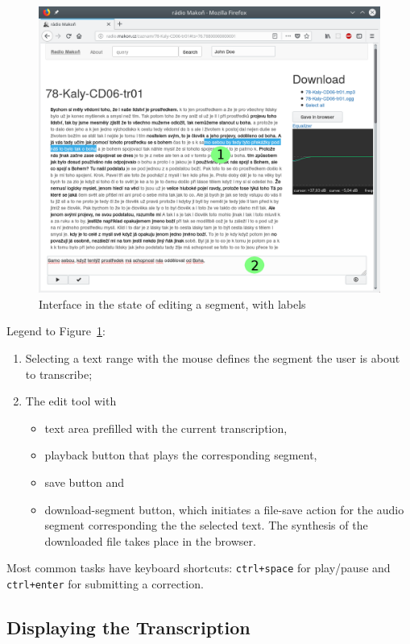 \documentclass{svproc}
\begin{document}
\begin{figure}[htpb]
\includegraphics[scale=0.6]{rc/radio-makon-en-2-lab.png}
\caption{Interface in the state of editing a segment, with labels}
\label{fig:scn2lab}
\end{figure}

Legend to Figure~\ref{fig:scn2lab}:
\begin{enumerate}
\item{
    Selecting a text range with the mouse defines the segment the user is about
    to transcribe;
}
\item{
    The edit tool with
    \begin{itemize}
    \item{text area prefilled with the current transcription,}
    \item{playback button that plays the corresponding segment,}
    \item{save button and}
    \item{download-segment button, which initiates a file-save action for the
    audio segment corresponding the the selected text. The synthesis of the
    downloaded file takes place in the browser.}
    \end{itemize}
}
\end{enumerate}

Most common tasks have keyboard shortcuts: \texttt{ctrl+space} for play/pause
and \texttt{ctrl+enter} for submitting a correction.

\subsection{Displaying the Transcription}
\end{document}
